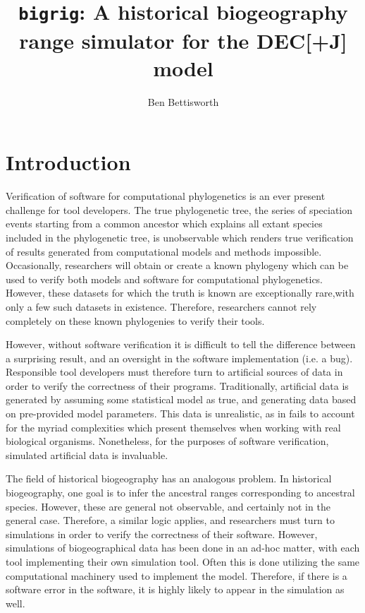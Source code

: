 \documentclass{article}
\title{\texttt{bigrig}: A historical biogeography range simulator for the
	DEC[+J] model}
\author{Ben Bettisworth}
\begin{document}
\newcommand{\CountFull}[1]{|#1|_\text{full}}
\newcommand{\CountEmpty}[1]{|#1|_\text{empty}}
\newcommand{\bigrig}{\texttt{bigrig}}

\maketitle

\section{Introduction}

Verification of software for computational phylogenetics is an ever present
challenge for tool developers. 
The true phylogenetic tree, the series of speciation events starting from a
common ancestor which explains all extant species included in the phylogenetic
tree, is unobservable which renders true verification of results generated from
computational models and methods impossible.
Occasionally, researchers will obtain or create a known
phylogeny\cite{hillis_experimental_1992} which can be used to verify both models
and software for computational phylogenetics. 
However, these datasets for which the truth is known are exceptionally rare,with
only a few such datasets in existence.
Therefore, researchers cannot rely completely on these known phylogenies to
verify their tools.

However, without software verification it is difficult to tell the difference
between a surprising result, and an oversight in the software implementation
(i.e. a bug). 
Responsible tool developers must therefore turn to artificial sources of data
in order to verify the correctness of their programs.
Traditionally, artificial data is generated by assuming some statistical model
as true, and generating data based on pre-provided model parameters.
This data is unrealistic\cite{trost_simulations_2024}, as in fails to account
for the myriad complexities which present themselves when working with real
biological organisms.
Nonetheless, for the purposes of software verification, simulated artificial
data is invaluable.

The field of historical biogeography has an analogous problem.
In historical biogeography, one goal is to infer the ancestral ranges
corresponding to ancestral species.
However, these are general not observable, and certainly not in the general
case.
Therefore, a similar logic applies, and researchers must turn to simulations in
order to verify the correctness of their software.
However, simulations of biogeographical data has been done in an ad-hoc matter,
with each tool implementing their own simulation tool.
Often this is done utilizing the same computational machinery used to implement
the model.
Therefore, if there is a software error in the software, it is highly likely to
appear in the simulation as well.
\end{document}
